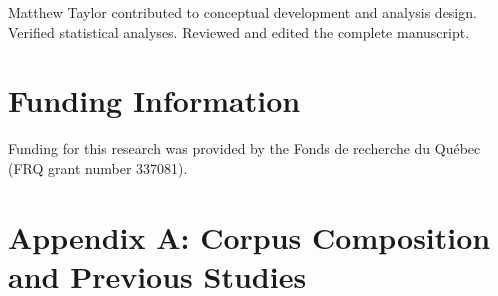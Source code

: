 \documentclass[12pt]{article}
\renewcommand\_{\texttt{\detokenize{_}\allowbreak}}
\begin{document}
Matthew Taylor contributed to conceptual development and analysis design. Verified statistical analyses. Reviewed and edited the complete manuscript.

\section{Funding Information}

Funding for this research was provided by the Fonds de recherche du Québec (FRQ grant number 337081).

\newpage
\printendnotes


\newpage
\appendix
\setcounter{table}{0}
\renewcommand{\thetable}{A\arabic{table}}
\renewcommand\theHtable{Appendix.\thetable}

\landscape
\section{Appendix A: Corpus Composition and Previous Studies}
\label{sec:appendix_corpus}
\label{sec:appendix_literature}
\end{document}
